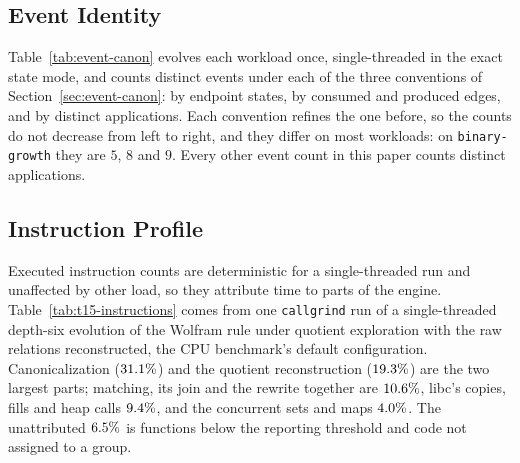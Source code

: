 \begin{table}[htbp]
\centering
\caption{Match forwarding on and off: one-edge left-hand side at depth eight, two-edge at depth
six. Best-of-$N$ wall times; both settings give identical state and event counts.}
\label{tab:t9-ablation}

\end{table}

\subsection{Event Identity}
Table~\ref{tab:event-canon} evolves each workload once, single-threaded in the exact state mode,
and counts distinct events under each of the three conventions of Section~\ref{sec:event-canon}:
by endpoint states, by consumed and produced edges, and by distinct applications. Each convention
refines the one before, so the counts do not decrease from left to right, and they differ on most
workloads: on \texttt{binary-growth} they are $5$, $8$ and $9$. Every other event count in this
paper counts distinct applications.

\begin{table}[htbp]
\centering
\caption{Distinct events per identity convention on each corpus workload.}
\label{tab:event-canon}

\end{table}

\subsection{Instruction Profile}
\label{sec:instruction-profile}

Executed instruction counts are deterministic for a single-threaded run and unaffected by other
load, so they attribute time to parts of the engine. Table~\ref{tab:t15-instructions}
comes from one \texttt{callgrind} run of a single-threaded depth-six evolution of the Wolfram rule
under quotient exploration with the raw relations reconstructed, the CPU benchmark's default
configuration. Canonicalization ($31.1\%$) and the quotient reconstruction
($19.3\%$) are the two largest parts; matching, its join and the rewrite together are
$10.6\%$, libc's copies, fills and heap calls $9.4\%$, and the concurrent
sets and maps $4.0\%$. The unattributed $6.5\%$
is functions below the reporting threshold and code not assigned to a group.

\begin{table}[htbp]
\centering
\caption{Executed instructions by component: a single-threaded depth-six
evolution of the Wolfram rule under quotient exploration with reconstruction, under
\texttt{callgrind}, grouped by the algorithm each function belongs to. The per-function profile
covers $\InstrFlatCoverage\%$ of the program total; the rest is below the annotator's reporting
threshold. The benchmark-harness row is the corpus set-up the benchmark performs before the
evolution.}
\label{tab:t15-instructions}

\end{table}

